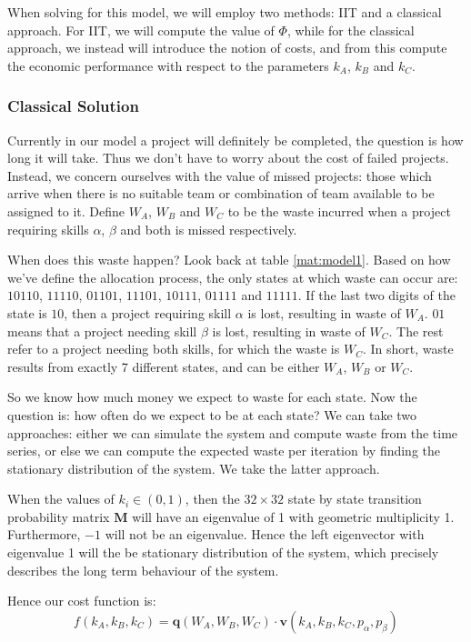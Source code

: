 When solving for this model, we will employ two methods: IIT and a classical approach. For IIT, we will compute the value of $\Phi$, while for the classical approach, we instead will introduce the notion of costs, and from this compute the economic performance with respect to the parameters $k_A$, $k_B$ and $k_C$. 

\subsubsection{Classical Solution}
Currently in our model a project will definitely be completed, the question is how long it will take. Thus we don't have to worry about the cost of failed projects. Instead, we concern ourselves with the value of missed projects: those which arrive when there is no suitable team or combination of team available to be assigned to it. Define $W_A$, $W_B$ and $W_C$ to be the waste incurred when a project requiring skills $\alpha$, $\beta$ and both  is missed respectively.

When does this waste happen? Look back at table \ref{mat:model1}. Based on how we've define the allocation process, the only states at which waste can occur are: $10110$, $11110$, $01101$, $11101$, $10111$, $01111$ and $11111$. If the last two digits of the state is $10$, then a project requiring skill $\alpha$ is lost, resulting in waste of $W_A$. $01$ means that a project needing skill $\beta$ is lost, resulting in waste of $W_C$. The rest refer to a project needing both skills, for which the waste is $W_C$. In short, waste results from exactly 7 different states, and can be either $W_A$, $W_B$ or $W_C$.

So we know how much money we expect to waste for each state. Now the question is: how often do we expect to be at each state? We can take two approaches: either we can simulate the system and compute waste from the time series, or else we can compute the expected waste per iteration by finding the stationary distribution of the system. We take the latter approach.

When the values of $k_i \in (0,1)$, then the $32\times32$ state by state transition probability matrix $\mathbf{M}$ will have an eigenvalue of 1 with geometric multiplicity 1. Furthermore, $-1$ will not be an eigenvalue. Hence the left eigenvector with eigenvalue 1 will the be stationary distribution of the system, which precisely describes the long term behaviour of the system. 

Hence our cost function is:
\begin{equation}
\label{eq:simple_model_cost_function}
f(k_A, k_B, k_C) = \mathbf{q}(W_A, W_B, W_C) \cdot \mathbf{v}(k_A, k_B, k_C, p_\alpha, p_\beta)
\end{equation}

